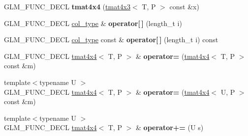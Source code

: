 \begin{DoxyCompactItemize}
\item 
G\+L\+M\+\_\+\+F\+U\+N\+C\+\_\+\+D\+E\+CL {\bfseries tmat4x4} (\hyperlink{structglm_1_1detail_1_1tmat4x3}{tmat4x3}$<$ T, P $>$ const \&x)\hypertarget{structglm_1_1detail_1_1tmat4x4_a1171d5bc85975c341d10e5ea766328dd}{}\label{structglm_1_1detail_1_1tmat4x4_a1171d5bc85975c341d10e5ea766328dd}

\item 
G\+L\+M\+\_\+\+F\+U\+N\+C\+\_\+\+D\+E\+CL \hyperlink{structglm_1_1detail_1_1tvec4}{col\+\_\+type} \& {\bfseries operator\mbox{[}$\,$\mbox{]}} (length\+\_\+t i)\hypertarget{structglm_1_1detail_1_1tmat4x4_a92cd87a0fb94052edec19265cfa505dd}{}\label{structglm_1_1detail_1_1tmat4x4_a92cd87a0fb94052edec19265cfa505dd}

\item 
G\+L\+M\+\_\+\+F\+U\+N\+C\+\_\+\+D\+E\+CL \hyperlink{structglm_1_1detail_1_1tvec4}{col\+\_\+type} const \& {\bfseries operator\mbox{[}$\,$\mbox{]}} (length\+\_\+t i) const \hypertarget{structglm_1_1detail_1_1tmat4x4_a273d9ba353a6a22d3783be76ea840547}{}\label{structglm_1_1detail_1_1tmat4x4_a273d9ba353a6a22d3783be76ea840547}

\item 
G\+L\+M\+\_\+\+F\+U\+N\+C\+\_\+\+D\+E\+CL \hyperlink{structglm_1_1detail_1_1tmat4x4}{tmat4x4}$<$ T, P $>$ \& {\bfseries operator=} (\hyperlink{structglm_1_1detail_1_1tmat4x4}{tmat4x4}$<$ T, P $>$ const \&m)\hypertarget{structglm_1_1detail_1_1tmat4x4_a64e75fbb008a4ac755ddf4f0139b56f2}{}\label{structglm_1_1detail_1_1tmat4x4_a64e75fbb008a4ac755ddf4f0139b56f2}

\item 
{\footnotesize template$<$typename U $>$ }\\G\+L\+M\+\_\+\+F\+U\+N\+C\+\_\+\+D\+E\+CL \hyperlink{structglm_1_1detail_1_1tmat4x4}{tmat4x4}$<$ T, P $>$ \& {\bfseries operator=} (\hyperlink{structglm_1_1detail_1_1tmat4x4}{tmat4x4}$<$ U, P $>$ const \&m)\hypertarget{structglm_1_1detail_1_1tmat4x4_a43fc3af37580faf4fa172ab4ccc168ad}{}\label{structglm_1_1detail_1_1tmat4x4_a43fc3af37580faf4fa172ab4ccc168ad}

\item 
{\footnotesize template$<$typename U $>$ }\\G\+L\+M\+\_\+\+F\+U\+N\+C\+\_\+\+D\+E\+CL \hyperlink{structglm_1_1detail_1_1tmat4x4}{tmat4x4}$<$ T, P $>$ \& {\bfseries operator+=} (U s)\hypertarget{structglm_1_1detail_1_1tmat4x4_ad89260d8ab56b889c7c926b0f51bb589}{}\label{structglm_1_1detail_1_1tmat4x4_ad89260d8ab56b889c7c926b0f51bb589}


\end{DoxyCompactItemize}
